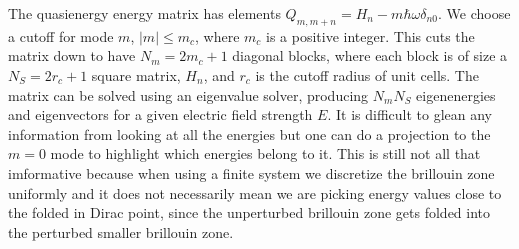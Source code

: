 The quasienergy energy matrix has elements $Q_{m,m+n} = H_n - m\hbar\omega\delta_{n0}$.
We choose a cutoff for mode $m$, $|m|\leq m_c$, where $m_c$ is a positive integer.
This cuts the matrix down to have $N_m = 2m_c+1$ diagonal blocks, where each block is of size a $N_S = 2r_c +1$ square matrix, $H_n$, and $r_c$ is the cutoff radius of unit cells.
The matrix can be solved using an eigenvalue solver, producing $N_m N_S$ eigenenergies and eigenvectors for a given electric field strength $E$.
It is difficult to glean any information from looking at all the energies but one can do a projection to the $m=0$ mode to highlight which energies belong to it.
This is still not all that imformative because when using a finite system we discretize the brillouin zone uniformly and it does not necessarily mean we are picking energy values close to the folded in Dirac point, since the unperturbed brillouin zone gets folded into the perturbed smaller brillouin zone.
